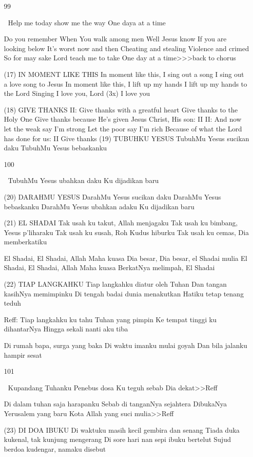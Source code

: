 \documentclass[10pt,a5paper,fancyhdr]{memoir}
\begin{document}
99 



Help me today show me the way 
One daya at a time 

Do you remember 
When You walk among men 
Well Jesus know 
If you are looking below 
It’s worst now and then 
Cheating and stealing 
Violence and crimed 
So for may sake Lord teach me to take 
One day at a time>>>back to chorus 

(17) IN MOMENT LIKE THIS 
In moment like this, I sing out a song 
I sing out a love song to Jesus 
In moment like this, I lift up my hands 
I lift up my hands to the Lord 
Singing I love you, Lord (3x) I love you 

(18) GIVE THANKS 
II: Give thanks with a greatful heart 
Give thanks to the Holy One 
Give thanks because He’s given 
Jesus Christ, His son: II 
II: And now let the weak say I’m strong 
Let the poor say I’m rich 
Because of what the Lord has done for us: II 
Give thanks 
(19) TUBUHKU YESUS 
TubuhMu Yesus sucikan daku 
TubuhMu Yesus bebaskanku 

100 



TubuhMu Yesus ubahkan daku 
Ku dijadikan baru 

(20) DARAHMU YESUS 
DarahMu Yesus sucikan daku 
DarahMu Yesus bebaskanku 
DarahMu Yesus ubahkan adaku 
Ku dijadikan baru 

(21) EL SHADAI 
Tak usah ku takut, Allah menjagaku 
Tak usah ku bimbang, Yesus p’liharaku 
Tak usah ku susah, Roh Kudus hiburku 
Tak usah ku cemas, Dia memberkatiku 

El Shadai, El Shadai, Allah Maha kuasa 
Dia besar, Dia besar, el Shadai mulia 
El Shadai, El Shadai, Allah Maha kuasa 
BerkatNya melimpah, El Shadai 

(22) TIAP LANGKAHKU 
Tiap langkahku diatur oleh Tuhan 
Dan tangan kasihNya memimpinku 
Di tengah badai dunia menakutkan 
Hatiku tetap tenang teduh 

Reff: 
Tiap langkahku ku tahu Tuhan yang pimpin 
Ke tempat tinggi ku dihantarNya 
Hingga sekali nanti aku tiba 

Di rumah bapa, surga yang baka 
Di waktu imanku mulai goyah 
Dan bila jalanku hampir sesat 

101 



Kupandang Tuhanku Penebus dosa 
Ku teguh sebab Dia dekat>>Reff 

Di dalam tuhan saja harapanku 
Sebab di tanganNya sejahtera 
DibukaNya Yerusalem yang baru 
Kota Allah yang suci mulia>>Reff 

(23) DI DOA IBUKU 
Di waktuku masih kecil gembira dan senang 
Tiada duka kukenal, tak kunjung mengerang 
Di sore hari nan sepi ibuku bertelut 
Sujud berdoa kudengar, namaku disebut 
\end{document}
